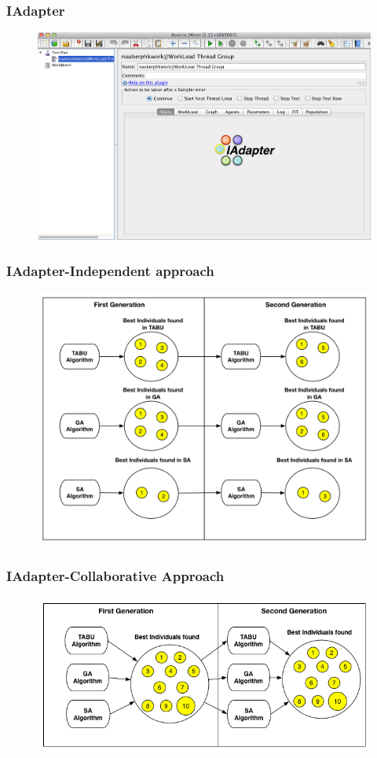 \documentclass{beamer}
\begin{document}
\begin{frame}
\frametitle{IAdapter}
\begin{figure}[H]
\centering
\includegraphics[width=1\linewidth]{iadapter1.png}
\end{figure}
\end{frame}


\begin{frame}
\frametitle{IAdapter-Independent approach}
\begin{figure}[H]
\centering
\includegraphics[width=0.8\linewidth]{independ.png}
\end{figure}
\end{frame}



\begin{frame}
\frametitle{IAdapter-Collaborative Approach}
\begin{figure}[H]
\centering
\includegraphics[width=1\linewidth]{collaborative.png}
\end{figure}
\end{frame}
\end{document}
